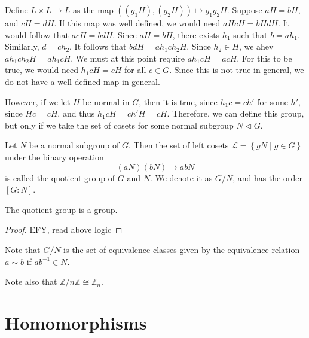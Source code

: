 Define $L\times L\to L$ as the map $\left( (g_1H),(g_2H) \right) \mapsto g_1g_2H$. Suppose $aH=bH$, and $cH=d H$. If this map was well defined, we would need $aHcH=bHdH$. It would follow that $acH=bdH$. Since $aH=bH$, there exists $h_1$ such that $b=ah_1$. Similarly, $d=ch_2$. It follows that $bdH=ah_1ch_2H$. Since $h_2\in H$, we ahev $ah_1ch_2H=ah_1cH$. We must at this point require $ah_1cH=acH$. For this to be true, we would need $h_1cH=cH$ for all $c\in G$. Since this is not true in general, we do not have a well defined map in general.

However, if we let $H$ be normal in $G$, then it is true, since $h_1c=ch'$ for some $h'$, since $Hc=cH$, and thus $h_1cH=ch'H=cH$. Therefore, we can define this group, but only if we take the set of cosets for some normal subgroup $N\triangleleft G$.
\begin{definition}\label{dfn:quot}
	Let $N$ be a normal subgroup of $G$. Then the set of left cosets $\mathcal{L} =\left\{ gN \mid g\in G \right\} $ under the binary operation
	\[
		(aN)(bN)\mapsto abN
	\]
	is called the quotient group of $G$ and $N$. We denote it as $G/N$, and has the order $\left[ G:N \right] $.
\end{definition}
\begin{theorem}\label{thm:kjsd}
	The quotient group is a group.
\end{theorem}
\begin{proof}
	EFY, read above logic
\end{proof}
\begin{remark}
	Note that $G/N$ is the set of equivalence classes given by the equivalence relation $a\sim b$ if $ab^{-1}\in N$.
\end{remark}
Note also that $\mathbb{Z} / n\mathbb{Z}\cong \mathbb{Z}_n$.
\chapter{Homomorphisms}
